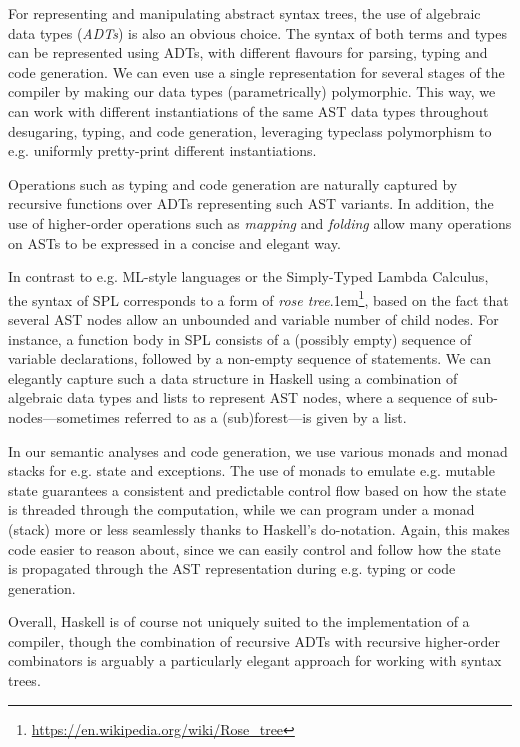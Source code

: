 For representing and manipulating abstract syntax trees, the use of algebraic
data types (\emph{ADTs}) is also an obvious choice. The syntax of both terms and
types can be represented using ADTs, with different flavours for parsing, typing
and code generation.
We can even use a single representation for several stages of the compiler by
making our data types (parametrically) polymorphic. This way, we can work with
different instantiations of the same AST data types throughout desugaring,
typing, and code generation, leveraging typeclass polymorphism to e.g.
uniformly pretty-print different instantiations.

Operations such as typing and code generation are naturally captured by
recursive functions over ADTs representing such AST variants. In addition, the
use of higher-order operations such as \emph{mapping} and \emph{folding} allow
many operations on ASTs to be expressed in a concise and elegant way.

In contrast to e.g. ML-style languages or the Simply-Typed Lambda Calculus, the
syntax of SPL corresponds to a form of
\emph{rose tree}\kern.1em\footnote{\url{https://en.wikipedia.org/wiki/Rose_tree}},
based on the fact that several AST nodes allow an unbounded and variable number
of child nodes.
For instance, a function body in SPL consists of a (possibly empty) sequence of
variable declarations, followed by a non-empty sequence of statements.
We can elegantly capture such a data structure in Haskell using a combination of
algebraic data types and lists to represent AST nodes, where a sequence of
sub-nodes---sometimes referred to as a (sub)forest---is given by a list.

In our semantic analyses and code generation, we use various monads and monad
stacks for e.g. state and exceptions.
The use of monads to emulate e.g. mutable state guarantees a consistent and
predictable control flow based on how the state is threaded through the
computation, while we can program under a monad (stack) more or less seamlessly
thanks to Haskell's do-notation.
Again, this makes code easier to reason about, since we can easily control and
follow how the state is propagated through the AST representation during e.g.
typing or code generation.

Overall, Haskell is of course not uniquely suited to the implementation of a
compiler, though the combination of recursive ADTs with recursive higher-order
combinators is arguably a particularly elegant approach for working with syntax
trees.
